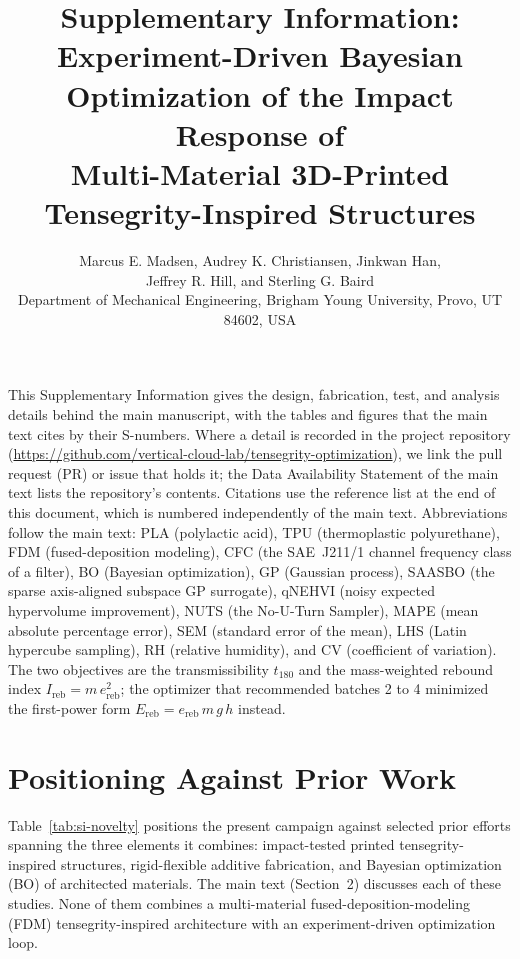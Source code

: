 \documentclass[11pt]{article}
\title{Supplementary Information:\\
  Experiment-Driven Bayesian Optimization of the Impact Response of\\
  Multi-Material 3D-Printed Tensegrity-Inspired Structures}
\author{Marcus E. Madsen, Audrey K. Christiansen, Jinkwan Han,\\ Jeffrey R. Hill, and Sterling G. Baird\\
  {\small Department of Mechanical Engineering, Brigham Young University, Provo, UT 84602, USA}}
\date{}
\newcommand{\repo}{https://github.com/vertical-cloud-lab/tensegrity-optimization}
\begin{document}
\maketitle

This Supplementary Information gives the design, fabrication, test, and
analysis details behind the main manuscript, with the tables and figures
that the main text cites by their S-numbers. Where a detail is recorded in
the project repository (\href{\repo}{\repo}), we link the pull request (PR)
or issue that holds it; the Data Availability Statement of the main text
lists the repository's contents. Citations use the reference list at the
end of this document, which is numbered independently of the main text.
Abbreviations follow the main text: PLA (polylactic acid), TPU
(thermoplastic polyurethane), FDM (fused-deposition modeling), CFC (the
SAE~J211/1 channel frequency class of a filter), BO (Bayesian
optimization), GP (Gaussian process), SAASBO (the sparse axis-aligned
subspace GP surrogate), qNEHVI (noisy expected hypervolume improvement),
NUTS (the No-U-Turn Sampler), MAPE (mean absolute percentage error), SEM
(standard error of the mean), LHS (Latin hypercube sampling), RH (relative
humidity), and CV (coefficient of variation). The two objectives are the
transmissibility $t_{180}$ and the mass-weighted rebound index
$I_{\mathrm{reb}} = m\,e_{\mathrm{reb}}^2$; the optimizer that recommended
batches 2 to 4 minimized the first-power form
$E_{\mathrm{reb}} = e_{\mathrm{reb}}\,m\,g\,h$ instead.

\section{Positioning Against Prior Work}
\label{si:novelty}
Table~\ref{tab:si-novelty} positions the present campaign against selected
prior efforts spanning the three elements it combines: impact-tested printed
tensegrity-inspired structures, rigid-flexible additive fabrication, and
Bayesian optimization (BO) of architected materials. The main text
(Section~2) discusses each of these studies. None of them combines a
multi-material fused-deposition-modeling (FDM) tensegrity-inspired
architecture with an experiment-driven optimization loop.
\end{document}

